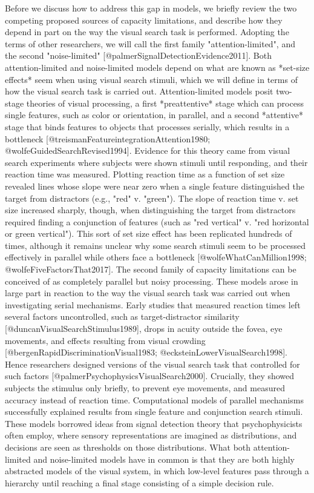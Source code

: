 \documentclass[10pt,letterpaper]{article}
\begin{document}
Before we discuss how to address this gap in models, we briefly review the two competing 
proposed sources of capacity limitations, and describe how they depend in part on the 
way the visual search task is performed. Adopting the terms of other researchers, we will 
call the first family "attention-limited", and the second "noise-limited" 
[@palmerSignalDetectionEvidence2011]. Both attention-limited and noise-limited models 
depend on what are known as *set-size effects* seem when using visual search stimuli, 
which we will define in terms of how the visual search task is carried out. 
Attention-limited models posit two-stage theories of visual processing, a first 
*preattentive* stage which can process single features, such as color or orientation, 
in parallel, and a second *attentive* stage that binds features to objects that processes 
serially, which results in a bottleneck [@treismanFeatureintegrationAttention1980; 
@wolfeGuidedSearchRevised1994]. Evidence for this theory came from visual search 
experiments where subjects were shown stimuli until responding, and their reaction time 
was measured. Plotting reaction time as a function of set size revealed 
lines whose slope were near zero when a single feature distinguished the target from 
distractors (e.g., "red" v. "green"). The slope of reaction time v. set size increased 
sharply, though, when distinguishing the target from distractors required finding a 
conjunction of features (such as "red vertical" v. "red horizontal or green vertical"). 
This sort of set size effect has been replicated hundreds of times, although it remains 
unclear why some search stimuli seem to be processed effectively in parallel while others 
face a bottleneck [@wolfeWhatCanMillion1998; @wolfeFiveFactorsThat2017].
The second family of capacity limitations can be conceived of as completely parallel but 
noisy processing. These models arose in large part in reaction 
to the way the visual search task was carried out when investigating
serial mechanisms. Early studies that measured reaction times left several factors 
uncontrolled, such as target-distractor similarity [@duncanVisualSearchStimulus1989], 
drops in acuity outside the fovea, eye movements, and effects resulting from visual 
crowding [@bergenRapidDiscriminationVisual1983; @ecksteinLowerVisualSearch1998]. 
Hence researchers designed versions of the visual search task that controlled for such 
factors [@palmerPsychophysicsVisualSearch2000]. Crucially, they showed subjects the 
stimulus only briefly, to prevent eye movements, and measured accuracy instead of reaction
time. Computational models of parallel mechanisms successfully explained results from 
single feature and conjunction search stimuli. These models borrowed ideas from signal 
detection theory that psychophysicists often employ, where sensory representations are
imagined as distributions, and decisions are seen as thresholds on those distributions.
What both attention-limited and noise-limited models have in common is that they are 
both highly abstracted models of the visual system, in which low-level features pass 
through a hierarchy until reaching a final stage consisting of a simple decision rule.
\end{document}
